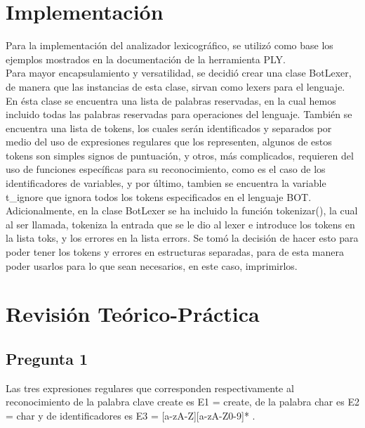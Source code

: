 \documentclass{article}
\begin{document}
\section{Implementación}
\hspace{0.5cm} Para la implementación del analizador lexicográfico, se utilizó como base los ejemplos mostrados en la documentación de la herramienta PLY. \\

\hspace{0.5cm} Para mayor encapsulamiento y versatilidad, se decidió crear una clase BotLexer, de manera que las instancias de esta clase, sirvan como lexers para el lenguaje. En ésta clase se encuentra una lista de palabras reservadas, en la cual hemos incluido todas las palabras reservadas para operaciones del lenguaje. También se encuentra una lista de tokens, los cuales serán identificados y separados por medio del uso de expresiones regulares que los representen, algunos de estos tokens son simples signos de puntuación, y otros, más complicados, requieren del uso de funciones específicas para su reconocimiento, como es el caso de los identificadores de variables, y por último, tambien se encuentra la variable t\_ignore que ignora todos los tokens especificados en el lenguaje BOT. \\

\hspace{0.5cm} Adicionalmente, en la clase BotLexer se ha incluido la función tokenizar(), la cual al ser llamada, tokeniza la entrada que se le dio al lexer e introduce los tokens en la lista toks, y los errores en la lista errors. Se tomó la decisión de hacer esto para poder tener los tokens y errores en estructuras separadas, para de esta manera poder usarlos para lo que sean necesarios, en este caso, imprimirlos.

\newpage

\section{Revisión Teórico-Práctica}
\subsection{Pregunta 1}
\hspace{0.5cm} Las tres expresiones regulares que corresponden respectivamente al reconocimiento de la palabra clave create es E1 = create, de la palabra char es E2 = char y de identificadores es E3 = [a-zA-Z][a-zA-Z0-9]* . 
\end{document}
